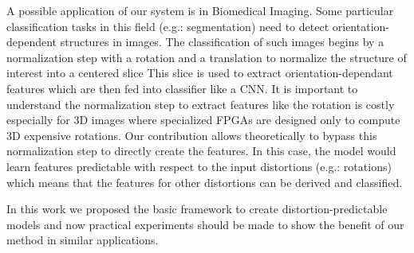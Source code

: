 \documentclass[a4paper,12pt]{report}
\newcommand{\eg}{e.g.}
\begin{document}

A possible application of our system is in Biomedical Imaging.
Some particular classification tasks in this field (\eg: segmentation) need to detect orientation-dependent structures in images.
The classification of such images begins by a normalization step with a rotation and a translation to normalize the structure of interest into a centered slice
This slice is used to extract orientation-dependant features which are then fed into classifier like a CNN.
It is important to understand the normalization step to extract features like the rotation is costly especially for 3D images where specialized FPGAs are designed only to compute 3D expensive rotations.
Our contribution allows theoretically to bypass this normalization step to directly create the features.
In this case, the model would learn features predictable with respect to the input distortions (\eg: rotations) which means that the features for other distortions can be derived and classified.

In this work we proposed the basic framework to create distortion-predictable models and now practical experiments should be made to show the benefit of our method in similar applications.



{}


\nocite{lecun2004learning}
\end{document}
